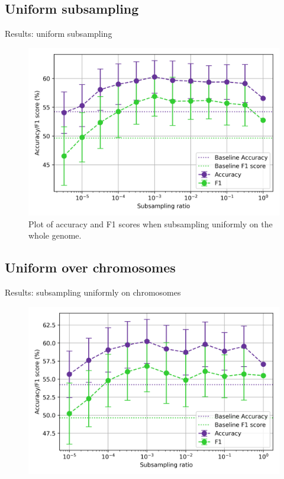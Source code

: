 \documentclass[aspectratio=169]{beamer}
\begin{document}
\subsection{Uniform subsampling}
\begin{frame}{Results: uniform subsampling}
\begin{figure}[H]
    \centering
    \includegraphics[height=0.5\textwidth]{../figures/subsample_plot.png}
    \caption{Plot of accuracy and F1 scores when subsampling uniformly on the whole genome.}
    \label{fig:res1a}
\end{figure}
\end{frame}

\subsection{Uniform over chromosomes}
\begin{frame}{Results: subsampling uniformly on chromosomes}
\begin{figure}[H]
    \centering
    \includegraphics[height=0.5\textwidth]{../figures/uniform_sample_low_ratio.png}
    \label{fig:res1b}
\end{figure}
\end{frame}
\end{document}
